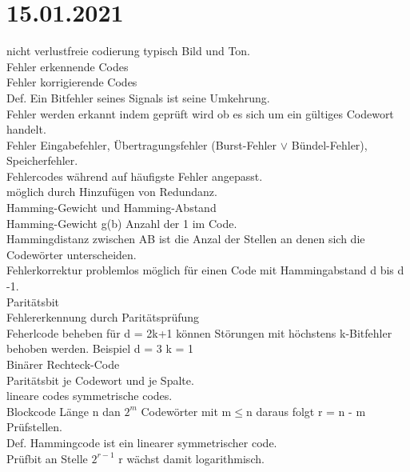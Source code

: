 \documentclass{article}
\begin{document}
	\section*{15.01.2021}
	nicht verlustfreie codierung typisch Bild und Ton. \\
	Fehler erkennende Codes \\
	Fehler korrigierende Codes \\
	Def. Ein Bitfehler seines Signals ist seine Umkehrung. \\
	Fehler werden erkannt indem geprüft wird ob es sich um ein gültiges Codewort handelt. \\
	Fehler Eingabefehler, Übertragungsfehler (Burst-Fehler $\lor$ Bündel-Fehler), Speicherfehler. \\
	Fehlercodes während auf häufigste Fehler angepasst. \\
	möglich durch Hinzufügen von Redundanz. \\
	Hamming-Gewicht und Hamming-Abstand \\
	Hamming-Gewicht g(b) Anzahl der 1 im Code. \\
	Hammingdistanz zwischen AB ist die Anzal der Stellen an denen sich die Codewörter unterscheiden. \\
	Fehlerkorrektur problemlos möglich für einen Code mit Hammingabstand d bis d -1. \\
	Paritätsbit \\
	Fehlererkennung durch Paritätsprüfung \\
	Feherlcode beheben für d = 2k+1 können Störungen mit höchstens k-Bitfehler behoben werden. Beispiel d = 3 k = 1 \\
	Binärer Rechteck-Code \\
	Paritätsbit je Codewort und je Spalte. \\
	lineare codes symmetrische codes. \\
	Blockcode Länge n dan $2^m$ Codewörter mit m$\leq$n daraus folgt r = n - m Prüfstellen. \\
	Def. Hammingcode ist ein linearer symmetrischer code. \\
	Prüfbit an Stelle $2^{r-1}$ r wächst damit logarithmisch. \\
\end{document}
